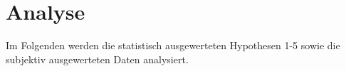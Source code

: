\documentclass[a4paper,11pt]{article}%
\renewcommand{\\}{\vspace*{0.5\baselineskip} \newline}
\begin{document}
{\clearpage
\newpage
\section{Analyse}
Im Folgenden werden die statistisch ausgewerteten Hypothesen 1-5 sowie die subjektiv ausgewerteten Daten analysiert.
}
\end{document}

